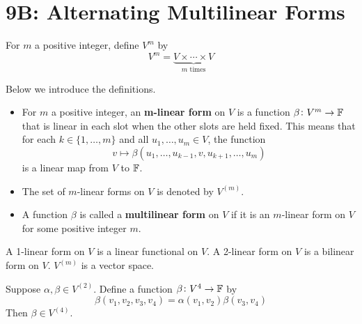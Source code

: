 \documentclass{extarticle}
\begin{document}

\newpage 
\section*{9B: Alternating Multilinear Forms}

\begin{definition}[\(V^m\)]
    For \(m\) a positive integer, define \(V^m\) by 
    \[V^m = \underbrace{V \times \cdots \times V}_{m \text{ times}}\]
\end{definition}

\begin{definition}
    Below we introduce the definitions.
    \begin{itemize}
        \item For \(m\) a positive integer, an \textbf{m-linear form} on \(V\) is a function 
        \(\beta \colon V^m \to \mathbb{F}\) that is linear in each slot when the other slots are held fixed. This means 
        that for each \(k \in \{1, \ldots, m\}\) and all \(u_1, \ldots, u_m \in V\), the function 
        \[v \mapsto \beta(u_1, \ldots, u_{k-1}, v, u_{k+1}, \ldots, u_m)\]
        is a linear map from \(V\) to \(\mathbb{F}\).
        
        \item The set of \(m\)-linear forms on \(V\) is denoted by \(V^{(m)}\). 
        \item A function \(\beta\) is called a \textbf{multilinear form} on \(V\) if it is an \(m\)-linear form on 
        \(V\) for some positive integer \(m\).
    \end{itemize}
\end{definition}

\begin{remark}
    A 1-linear form on \(V\) is a linear functional on \(V\). A 2-linear form on \(V\) is a bilinear form 
    on \(V\). \(V^{(m)}\) is a vector space. 
\end{remark}

\begin{example}
    Suppose \(\alpha, \beta \in V^{(2)}\). Define a function \(\beta \colon V^4 \to \mathbb{F}\) by 
    \[\beta(v_1, v_2, v_3, v_4) = \alpha(v_1, v_2) \beta(v_3, v_4)\] 
    Then \(\beta \in V^{(4)}\).
\end{example}
\end{document}
